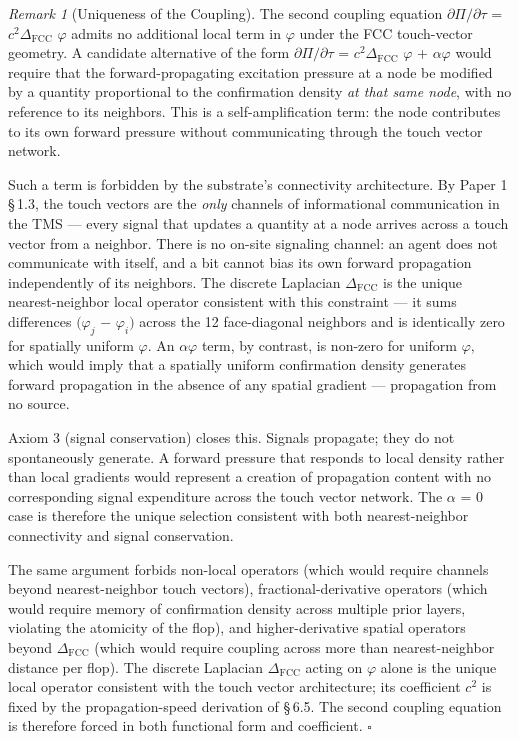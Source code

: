 \documentclass[11pt,oneside]{report}
\theoremstyle{definition}
\theoremstyle{remark}
\newtheorem{remark}[theorem]{Remark}
\begin{document}
\begin{remark}[Uniqueness of the Coupling]
The second coupling
equation \ensuremath{\partial \Pi /\partial \tau} = \ensuremath{c^{2}\Delta_{\mathrm{FCC}}} \ensuremath{\varphi} admits no additional local term in \ensuremath{\varphi} under the
FCC touch-vector geometry. A candidate alternative of the form \ensuremath{\partial \Pi /\partial \tau} =
\ensuremath{c^{2}\Delta_{\mathrm{FCC}}} \ensuremath{\varphi} + \ensuremath{\alpha \varphi} would require that the forward-propagating excitation
pressure at a node be modified by a quantity proportional to the
confirmation density \emph{at that same node}, with no reference to its
neighbors. This is a self-amplification term: the node contributes to
its own forward pressure without communicating through the touch vector
network.
\end{remark}

Such a term is forbidden by the substrate's connectivity architecture.
By Paper 1 \S\,1.3, the touch vectors are the \emph{only} channels of
informational communication in the TMS --- every signal that updates a
quantity at a node arrives across a touch vector from a neighbor. There
is no on-site signaling channel: an agent does not communicate with
itself, and a bit cannot bias its own forward propagation independently
of its neighbors. The discrete Laplacian \ensuremath{\Delta_{\mathrm{FCC}}} is the unique
nearest-neighbor local operator consistent with this constraint --- it
sums differences \ensuremath{(\varphi_{j}} \ensuremath{-} \ensuremath{\varphi_{i})} across the 12 face-diagonal neighbors and is
identically zero for spatially uniform \ensuremath{\varphi .} An \ensuremath{\alpha \varphi} term, by contrast, is
non-zero for uniform \ensuremath{\varphi ,} which would imply that a spatially uniform
confirmation density generates forward propagation in the absence of any
spatial gradient --- propagation from no source.

Axiom 3 (signal conservation) closes this. Signals propagate; they do
not spontaneously generate. A forward pressure that responds to local
density rather than local gradients would represent a creation of
propagation content with no corresponding signal expenditure across the
touch vector network. The \ensuremath{\alpha} = 0 case is therefore the unique selection
consistent with both nearest-neighbor connectivity and signal
conservation.

The same argument forbids non-local operators (which would require
channels beyond nearest-neighbor touch vectors), fractional-derivative
operators (which would require memory of confirmation density across
multiple prior layers, violating the atomicity of the flop), and
higher-derivative spatial operators beyond \ensuremath{\Delta_{\mathrm{FCC}}} (which would require
coupling across more than nearest-neighbor distance per flop). The
discrete Laplacian \ensuremath{\Delta_{\mathrm{FCC}}} acting on \ensuremath{\varphi} alone is the unique local operator
consistent with the touch vector architecture; its coefficient \ensuremath{c^{2}} is
fixed by the propagation-speed derivation of \S\,6.5. The second coupling
equation is therefore forced in both functional form and coefficient. \hfill\ensuremath{\square}
\end{document}

